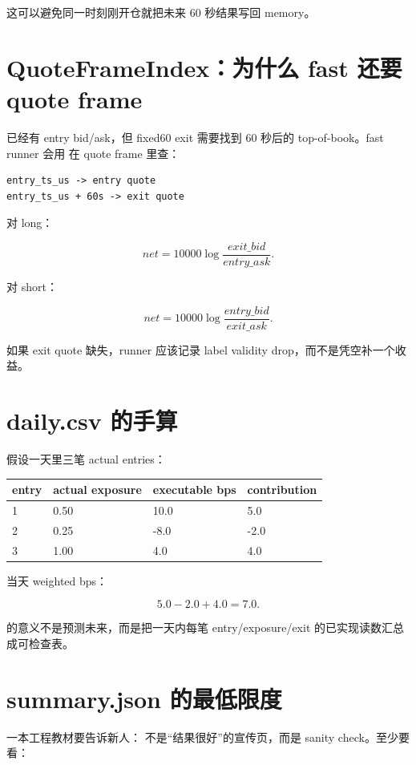 这可以避免同一时刻刚开仓就把未来 60 秒结果写回 memory。

\section{QuoteFrameIndex：为什么 fast 还要 quote frame}

 已经有 entry bid/ask，但 fixed60 exit 需要找到 60 秒后的 top-of-book。fast runner 会用  在 quote frame 里查：

\begin{lstlisting}
entry_ts_us -> entry quote
entry_ts_us + 60s -> exit quote
\end{lstlisting}

对 long：

\[
net=10000\log\frac{exit\_bid}{entry\_ask}.
\]

对 short：

\[
net=10000\log\frac{entry\_bid}{exit\_ask}.
\]

如果 exit quote 缺失，runner 应该记录 label validity drop，而不是凭空补一个收益。

\section{daily.csv 的手算}

假设一天里三笔 actual entries：

\begin{longtable}{p{}p{}p{}p{}}
\toprule
entry & actual exposure & executable bps & contribution \\
\midrule
1 & 0.50 & 10.0 & 5.0 \\
2 & 0.25 & -8.0 & -2.0 \\
3 & 1.00 & 4.0 & 4.0 \\
\bottomrule
\end{longtable}

当天 weighted bps：

\[
5.0-2.0+4.0=7.0.
\]

 的意义不是预测未来，而是把一天内每笔 entry/exposure/exit 的已实现读数汇总成可检查表。

\section{summary.json 的最低限度}

一本工程教材要告诉新人： 不是“结果很好”的宣传页，而是 sanity check。至少要看：


